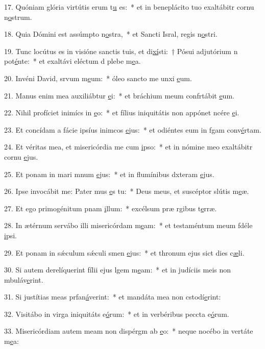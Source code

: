 17. Quóniam glória virtútis erum t\uline{u} es:~* et in beneplácito tuo exaltábitr cornu n\uline{o}strum.\par 
18. Quia Dómini est assúmpto n\uline{o}stra,~* et Sancti Isral, regis n\uline{o}stri.\par 
19. Tunc locútus es in visióne sanctis tuis, et di\uline{xí}sti:~† Pósui adjutórium n pot\uline{é}nte:~* et exaltávi eléctum d plebe m\uline{e}a.\par 
20. Invéni David, srvum m\uline{e}um:~* óleo sancto me unxi \uline{e}um.\par 
21. Manus enim mea auxiliábtur \uline{e}i:~* et bráchium meum confrtábit \uline{e}um.\par 
22. Nihil profíciet inimícs in \uline{e}o:~* et fílius iniquitátis non appónet ncére \uline{e}i.\par 
23. Et concídam a fácie ipsíus inimcos \uline{e}jus:~* et odiéntes eum in fgam conv\uline{é}rtam.\par 
24. Et véritas mea, et misericórdia me cum \uline{i}pso:~* et in nómine meo exaltábitr cornu \uline{e}jus.\par 
25. Et ponam in mari mnum \uline{e}jus:~* et in flumínibus dxteram \uline{e}jus.\par 
26. Ipse invocábit me: Pater mus \uline{e}s tu:~* Deus meus, et suscéptor slútis m\uline{e}æ.\par 
27. Et ego primogénitum pnam \uline{i}llum:~* excélsum præ rgibus t\uline{e}rræ.\par 
28. In ætérnum servábo illi misericórdam m\uline{e}am:~* et testaméntum meum fdéle \uline{i}psi.\par 
29. Et ponam in sǽculum sǽculi smen \uline{e}jus:~* et thronum ejus sict dies c\uline{æ}li.\par 
30. Si autem derelíquerint fílii ejus lgem m\uline{e}am:~* et in judíciis meis non mbuláv\uline{e}rint.\par 
31. Si justítias meas prfan\uline{á}verint:~* et mandáta mea non cstodí\uline{e}rint:\par 
32. Visitábo in virga iniquitáts e\uline{ó}rum:~* et in verbéribus peccta e\uline{ó}rum.\par 
33. Misericórdiam autem meam non dispérgm ab \uline{e}o:~* neque nocébo in vertáte m\uline{e}a:\par 

